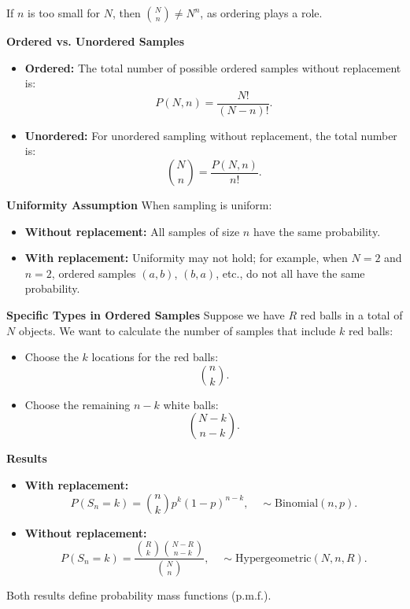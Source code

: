 \begin{rmk}
If \(n\) is too small for \(N\), then \(\binom{N}{n} \neq N^n\), as ordering plays a role.
\end{rmk}

\noindent\textbf{Ordered vs. Unordered Samples}
\begin{itemize}
    \item \textbf{Ordered:} The total number of possible ordered samples without replacement is:
    \[
    P(N, n) = \frac{N!}{(N-n)!}.
    \]
    \item \textbf{Unordered:} For unordered sampling without replacement, the total number is:
    \[
    \binom{N}{n} = \frac{P(N, n)}{n!}.
    \]
\end{itemize}

\noindent\textbf{Uniformity Assumption}
When sampling is uniform:
\begin{itemize}
    \item \textbf{Without replacement:} All samples of size \(n\) have the same probability.
    \item \textbf{With replacement:} Uniformity may not hold; for example, when \(N = 2\) and \(n = 2\), ordered samples \((a, b)\), \((b, a)\), etc., do not all have the same probability.
\end{itemize}

\noindent\textbf{Specific Types in Ordered Samples}
Suppose we have \(R\) red balls in a total of \(N\) objects. We want to calculate the number of samples that include \(k\) red balls:
\begin{itemize}
    \item Choose the \(k\) locations for the red balls:
    \[
    \binom{n}{k}.
    \]
    \item Choose the remaining \(n-k\) white balls:
    \[
    \binom{N-k}{n-k}.
    \]
\end{itemize}

\noindent\textbf{Results}
\begin{itemize}
    \item \textbf{With replacement:}
    \[
    P(S_n = k) = \binom{n}{k} p^k (1-p)^{n-k}, \quad \sim \text{Binomial}(n, p).
    \]
    \item \textbf{Without replacement:}
    \[
    P(S_n = k) = \frac{\binom{R}{k} \binom{N-R}{n-k}}{\binom{N}{n}}, \quad \sim \text{Hypergeometric}(N, n, R).
    \]
\end{itemize}

\begin{rmk}
Both results define probability mass functions (p.m.f.).
\end{rmk}

